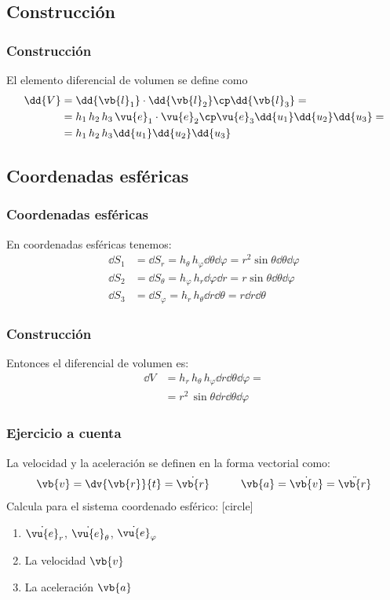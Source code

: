 \subsection{Construcción}
\begin{frame}
\frametitle{Construcción}
El elemento diferencial de volumen se define como
\begin{align*}
\dd{V} &= \dd{\vb{l}_{1}} \cdot \dd{\vb{l}_{2}} \cp \dd{\vb{l}_{3}} = \\
&= h_{1} \, h_{2} \, h_{3} \, \vu{e}_{1} \cdot \vu{e}_{2} \cp \vu{e}_{3} \dd{u_{1}} \dd{u_{2}} \dd{u_{3}} = \\
&= h_{1} \, h_{2} \, h_{3} \dd{u_{1}} \dd{u_{2}} \dd{u_{3}}
\end{align*}
\end{frame}
\subsection*{Coordenadas esféricas}
\begin{frame}
\frametitle{Coordenadas esféricas}
En coordenadas esféricas tenemos:
\begin{align*}
\dd{S_{1}} &= \dd{S_{r}} = h_{\theta} \, h_{\varphi} \dd{\theta} \dd{\varphi} = r^{2} \sin \theta \dd{\theta} \dd{\varphi} \\[0.5em]
\dd{S_{2}} &= \dd{S_{\theta}} = h_{\varphi} \, h_{r} \dd{\varphi} \dd{r} = r \sin \theta \dd{\theta} \dd{\varphi} \\[0.5em]
\dd{S_{3}} &= \dd{S_{\varphi}} = h_{r} \, h_{\theta} \dd{r} \dd{\theta} = r \dd{r} \dd{\theta}
\end{align*}
\end{frame}
\begin{frame}
\frametitle{Construcción}
Entonces el diferencial de volumen es:
\begin{align*}
\dd{V} &= h_{r} \, h_{\theta} \, h_{\varphi} \dd{r} \dd{\theta} \dd{\varphi} = \\[0.5em]
&= r^{2} \, \sin \theta \dd{r} \dd{\theta} \dd{\varphi}
\end{align*}
\end{frame}
\begin{frame}
\frametitle{Ejercicio a cuenta}
La velocidad y la aceleración se definen en la forma vectorial como:
\begin{align*}
\vb{v} = \dv{\vb{r}}{t} = \dot{\vb{r}} \hspace{1cm} \vb{a} = \dot{\vb{v}} = \ddot{\vb{r}}
\end{align*}
Calcula para el sistema coordenado esférico:
[circle]
\begin{enumerate}
\item $\dot{\vu{e}}_{r}$, $\dot{\vu{e}}_{\theta}$, $\dot{\vu{e}}_{\varphi}$ 
\item La velocidad $\vb{v}$
\item La aceleración $\vb{a}$
\end{enumerate}
\end{frame}
